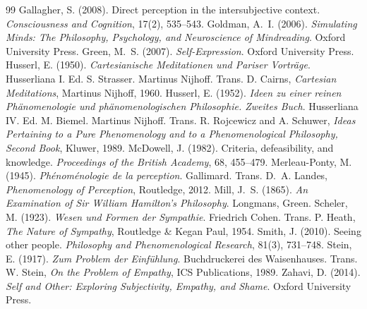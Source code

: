 \documentclass{situationist-preprint}
\begin{document}
\begin{thebibliography}{99}\small
{} Gallagher, S. (2008). Direct perception in the intersubjective context. \emph{Consciousness and Cognition}, 17(2), 535--543.
 Goldman, A.~I. (2006). \emph{Simulating Minds: The Philosophy, Psychology, and Neuroscience of Mindreading}. Oxford University Press.
 Green, M.~S. (2007). \emph{Self-Expression}. Oxford University Press.
 Husserl, E. (1950). \emph{Cartesianische Meditationen und Pariser Vortr\"age}. Husserliana I. Ed. S. Strasser. Martinus Nijhoff. Trans. D. Cairns, \emph{Cartesian Meditations}, Martinus Nijhoff, 1960.
 Husserl, E. (1952). \emph{Ideen zu einer reinen Ph\"anomenologie und ph\"anomenologischen Philosophie. Zweites Buch}. Husserliana IV. Ed. M. Biemel. Martinus Nijhoff. Trans. R. Rojcewicz and A. Schuwer, \emph{Ideas Pertaining to a Pure Phenomenology and to a Phenomenological Philosophy, Second Book}, Kluwer, 1989.
 McDowell, J. (1982). Criteria, defeasibility, and knowledge. \emph{Proceedings of the British Academy}, 68, 455--479.
 Merleau-Ponty, M. (1945). \emph{Ph\'enom\'enologie de la perception}. Gallimard. Trans. D.~A. Landes, \emph{Phenomenology of Perception}, Routledge, 2012.
 Mill, J.~S. (1865). \emph{An Examination of Sir William Hamilton's Philosophy}. Longmans, Green.
 Scheler, M. (1923). \emph{Wesen und Formen der Sympathie}. Friedrich Cohen. Trans. P. Heath, \emph{The Nature of Sympathy}, Routledge \& Kegan Paul, 1954.
 Smith, J. (2010). Seeing other people. \emph{Philosophy and Phenomenological Research}, 81(3), 731--748.
 Stein, E. (1917). \emph{Zum Problem der Einf\"uhlung}. Buchdruckerei des Waisenhauses. Trans. W. Stein, \emph{On the Problem of Empathy}, ICS Publications, 1989.
 Zahavi, D. (2014). \emph{Self and Other: Exploring Subjectivity, Empathy, and Shame}. Oxford University Press.
\end{thebibliography}
\end{document}
